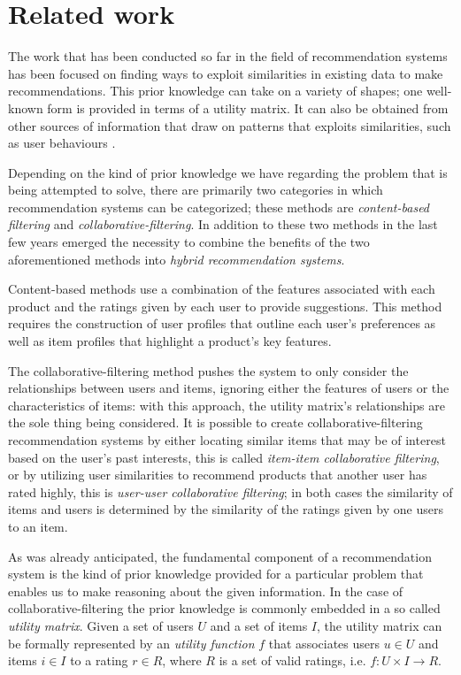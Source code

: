\section{Related work}

The work that has been conducted so far in the field of recommendation systems has been focused on finding ways to exploit similarities in existing data to make recommendations. This prior knowledge can take on a variety of shapes; one well-known form is provided in terms of a utility matrix. It can also be obtained from other sources of information that draw on patterns that exploits similarities, such as user behaviours \cite{user_behaviour_rec}. 


Depending on the kind of prior knowledge we have regarding the problem that is being attempted to solve, there are primarily two categories in which recommendation systems can be categorized; these methods are \emph{content-based filtering} and \emph{collaborative-filtering}. In addition to these two methods in the last few years emerged the necessity to combine the benefits of the two aforementioned methods into \emph{hybrid recommendation systems}.

Content-based methods use a combination of the features associated with each product and the ratings given by each user to provide suggestions. This method requires the construction of user profiles that outline each user's preferences as well as item profiles that highlight a product's key features. 

The collaborative-filtering method pushes the system to only consider the relationships between users and items, ignoring either the features of users or the characteristics of items: with this approach, the utility matrix's relationships are the sole thing being considered. It is possible to create collaborative-filtering recommendation systems by either locating similar items that may be of interest based on the user's past interests, this is called \emph{item-item collaborative filtering}, or by utilizing user similarities to recommend products that another user has rated highly, this is \emph{user-user collaborative filtering}; in both cases the similarity of items and users is determined by the similarity of the ratings given by one users to an item. 


As was already anticipated, the fundamental component of a recommendation system is the kind of prior knowledge provided for a particular problem that enables us to make reasoning about the given information. In the case of collaborative-filtering the prior knowledge is commonly embedded in a so called \emph{utility matrix}. Given a set of users $U$ and a set of items $I$, the utility matrix can be formally represented by an \emph{utility function} $f$ that associates users $u \in U$ and items $i \in I$ to a rating $r \in R$, where $R$ is a set of valid ratings, i.e. $f: U \times I \to R$.


